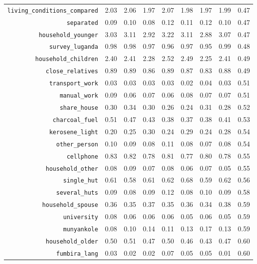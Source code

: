 \begin{longtable}{rrrrrrrrr}
  {\texttt{living\_conditions\_compared}} & 2.03 & 2.06 & 1.97 & 2.07 & 1.98 & 1.97 & 1.99 & 0.47 \\ 
  {\texttt{separated}} & 0.09 & 0.10 & 0.08 & 0.12 & 0.11 & 0.12 & 0.10 & 0.47 \\ 
  {\texttt{household\_younger}} & 3.03 & 3.11 & 2.92 & 3.22 & 3.11 & 2.88 & 3.07 & 0.47 \\ 
  {\texttt{survey\_luganda}} & 0.98 & 0.98 & 0.97 & 0.96 & 0.97 & 0.95 & 0.99 & 0.48 \\ 
  {\texttt{household\_children}} & 2.40 & 2.41 & 2.28 & 2.52 & 2.49 & 2.25 & 2.41 & 0.49 \\ 
  {\texttt{close\_relatives}} & 0.89 & 0.89 & 0.86 & 0.89 & 0.87 & 0.83 & 0.88 & 0.49 \\ 
  {\texttt{transport\_work}} & 0.03 & 0.03 & 0.03 & 0.03 & 0.02 & 0.04 & 0.03 & 0.51 \\ 
  {\texttt{manual\_work}} & 0.09 & 0.06 & 0.07 & 0.06 & 0.08 & 0.07 & 0.07 & 0.51 \\ 
  {\texttt{share\_house}} & 0.30 & 0.34 & 0.30 & 0.26 & 0.24 & 0.31 & 0.28 & 0.52 \\ 
  {\texttt{charcoal\_fuel}} & 0.51 & 0.47 & 0.43 & 0.38 & 0.37 & 0.38 & 0.41 & 0.53 \\ 
  {\texttt{kerosene\_light}} & 0.20 & 0.25 & 0.30 & 0.24 & 0.29 & 0.24 & 0.28 & 0.54 \\ 
  {\texttt{other\_person}} & 0.10 & 0.09 & 0.08 & 0.11 & 0.08 & 0.07 & 0.08 & 0.54 \\ 
  {\texttt{cellphone}} & 0.83 & 0.82 & 0.78 & 0.81 & 0.77 & 0.80 & 0.78 & 0.55 \\ 
  {\texttt{household\_other}} & 0.08 & 0.09 & 0.07 & 0.08 & 0.06 & 0.07 & 0.05 & 0.55 \\ 
  {\texttt{single\_hut}} & 0.61 & 0.58 & 0.61 & 0.62 & 0.68 & 0.59 & 0.62 & 0.56 \\ 
  {\texttt{several\_huts}} & 0.09 & 0.08 & 0.09 & 0.12 & 0.08 & 0.10 & 0.09 & 0.58 \\ 
  {\texttt{household\_spouse}} & 0.36 & 0.35 & 0.37 & 0.35 & 0.36 & 0.34 & 0.38 & 0.59 \\ 
  {\texttt{university}} & 0.08 & 0.06 & 0.06 & 0.06 & 0.05 & 0.06 & 0.05 & 0.59 \\ 
  {\texttt{munyankole}} & 0.08 & 0.10 & 0.14 & 0.11 & 0.13 & 0.17 & 0.13 & 0.59 \\ 
  {\texttt{household\_older}} & 0.50 & 0.51 & 0.47 & 0.50 & 0.46 & 0.43 & 0.47 & 0.60 \\ 
  {\texttt{fumbira\_lang}} & 0.03 & 0.02 & 0.02 & 0.07 & 0.05 & 0.05 & 0.01 & 0.60 \\ 

\end{longtable}
